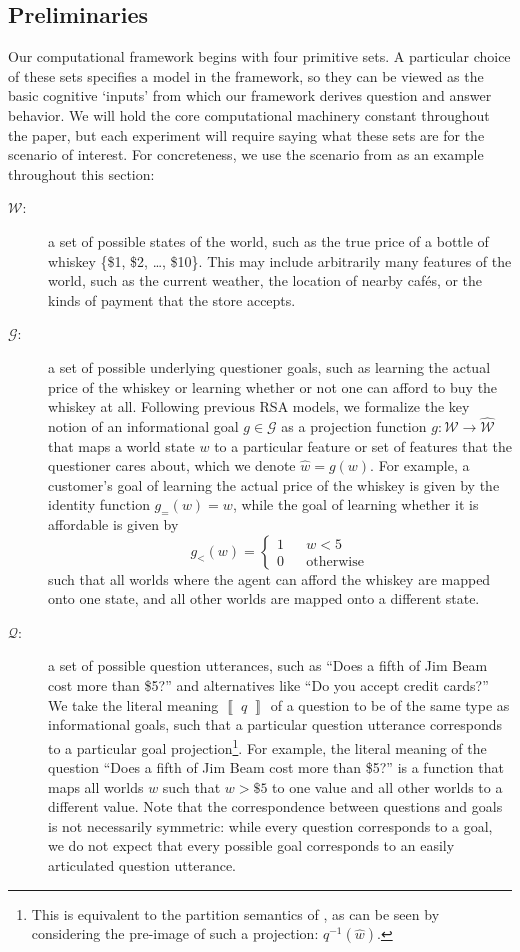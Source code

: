 \documentclass[11pt, floatsintext]{apa6}
\newcommand{\den}[2][]{
\(
\left\llbracket\;\text{#2}\;\right\rrbracket^{#1}
\)
}
\begin{document}
\label{sec:model}

\subsection{Preliminaries}

Our computational framework begins with four primitive sets. 
A particular choice of these sets specifies a model in the framework, so they can be viewed as the basic cognitive `inputs' from which our framework derives question and answer behavior. 
We will hold the core computational machinery constant throughout the paper, but each experiment will require saying what these sets are for  the scenario of interest.
For concreteness, we use the scenario from  as an example throughout this section: 
\begin{description}
\item[$\mathcal{W}$:] a set of possible states of the world, such as the true price of a bottle of whiskey \{\$1, \$2, \dots, \$10\}. This may include arbitrarily many features of the world, such as the current weather, the location of nearby caf\'es, or the kinds of payment that the store accepts.
\item[$\mathcal{G}$:] a set of possible underlying questioner goals, such as learning the actual price of the whiskey or learning whether or not one can afford to buy the whiskey at all. 
Following previous RSA models, we formalize the key notion of an informational goal $g \in \mathcal{G}$ as a projection function $g: \mathcal{W} \rightarrow \widehat{\mathcal{W}}$ that maps a world state $w$ to a particular feature or set of features that the questioner cares about, which we denote $\widehat{w} = g(w)$. 
For example, a customer's goal of learning the actual price of the whiskey is given by the identity function $g_{=}(w) = w$, while the goal of learning whether it is affordable is given by 
$$g_{<}(w) = \left\{\begin{array}{rcl}
1 & & w < 5 \\
0 & & \textrm{otherwise}
\end{array}\right.$$
such that all worlds where the agent can afford the whiskey are mapped onto one state, and all other worlds are mapped onto a different state.
\item[$\mathcal{Q}$:] a set of possible question utterances, such as ``Does a fifth of Jim Beam cost more than \$5?'' and alternatives like ``Do you accept credit cards?'' We take the literal meaning \den{$q$} of a question to be of the same type as informational goals, such that a particular question utterance corresponds to a particular goal projection\footnote{This is equivalent to the partition semantics of , as can be seen by considering the pre-image of such a projection: $q^{-1}(\hat{w})$.}. For example, the literal meaning of the question ``Does a fifth of Jim Beam cost more than \$5?'' is a function that maps all worlds $w$ such that $w > \$5$ to one value and all other worlds to a different value. Note that the correspondence between questions and goals is not necessarily symmetric: while every question corresponds to a goal, we do not expect that every possible goal corresponds to an easily articulated question utterance.

\end{description}
\end{document}
